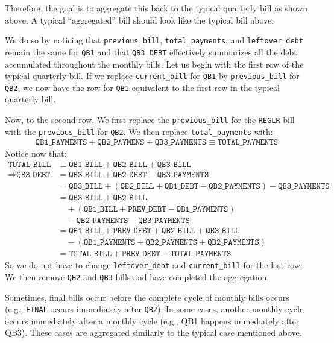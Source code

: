 \documentclass[11pt]{article}
\begin{document}
Therefore, the goal is to aggregate this back to the typical quarterly bill as shown above. A typical ``aggregated'' bill should look like the typical bill above.

We do so by noticing that \texttt{previous\_bill}, \texttt{total\_payments}, and \texttt{leftover\_debt} remain the same for \texttt{QB1} and that \texttt{QB3\_DEBT} effectively summarizes all the debt accumulated throughout the monthly bills. Let us begin with the first row of the typical quarterly bill. If we replace \texttt{current\_bill} for \texttt{QB1} by \texttt{previous\_bill} for \texttt{QB2}, we now have the row for \texttt{QB1} equivalent to the first row in the typical quarterly bill.

Now, to the second row. We first replace the \texttt{previous\_bill} for the \texttt{REGLR} bill with the \texttt{previous\_bill} for \texttt{QB2}. We then replace \texttt{total\_payments} with:
\begin{align*}
\texttt{QB1\_PAYMENTS}+\texttt{QB2\_PAYMENS}+\texttt{QB3\_PAYMENTS}\equiv\texttt{TOTAL\_PAYMENTS}
\end{align*}
Notice now that:
\begin{align*}
\texttt{TOTAL\_BILL} & \equiv\texttt{QB1\_BILL}+\texttt{QB2\_BILL}+\texttt{QB3\_BILL} \\
\Rightarrow\texttt{QB3\_DEBT} & =\texttt{QB3\_BILL}+\texttt{QB2\_DEBT}-\texttt{QB3\_PAYMENTS} \\
& =\texttt{QB3\_BILL}+(\texttt{QB2\_BILL}+\texttt{QB1\_DEBT}-\texttt{QB2\_PAYMENTS})-\texttt{QB3\_PAYMENTS} \\
& =\texttt{QB3\_BILL}+\texttt{QB2\_BILL} \\
& \quad+(\texttt{QB1\_BILL}+\texttt{PREV\_DEBT}-\texttt{QB1\_PAYMENTS}) \\
& \quad-\texttt{QB2\_PAYMENTS}-\texttt{QB3\_PAYMENTS} \\
& =\texttt{QB1\_BILL}+\texttt{PREV\_DEBT}+\texttt{QB2\_BILL}+\texttt{QB3\_BILL} \\
& \quad-(\texttt{QB1\_PAYMENTS}+\texttt{QB2\_PAYMENTS}+\texttt{QB2\_PAYMENTS}) \\
& =\texttt{TOTAL\_BILL}+\texttt{PREV\_DEBT}-\texttt{TOTAL\_PAYMENTS}
\end{align*}
So we do not have to change \texttt{leftover\_debt} and \texttt{current\_bill} for the last row. We then remove \texttt{QB2} and \texttt{QB3} bills and have completed the aggregation.

Sometimes, final bills occur before the complete cycle of monthly bills occurs (e.g., \texttt{FINAL} occurs immediately after \texttt{QB2}). In some cases, another monthly cycle occurs immediately after a monthly cycle (e.g., QB1 happens immediately after QB3). These cases are aggregated similarly to the typical case mentioned above.
\end{document}
